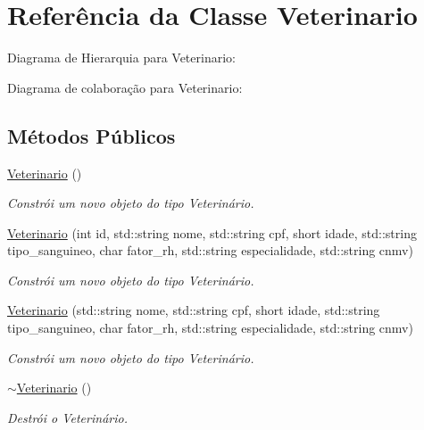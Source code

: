 \hypertarget{classVeterinario}{}\section{Referência da Classe Veterinario}
\label{classVeterinario}


Diagrama de Hierarquia para Veterinario\+:


Diagrama de colaboração para Veterinario\+:
\subsection*{Métodos Públicos}
\begin{DoxyCompactItemize}
\item 
\mbox{\label{classVeterinario_af8dc5f6f77bf8c70dd94d54766764134}} 
\hyperlink{classVeterinario_af8dc5f6f77bf8c70dd94d54766764134}{Veterinario} ()
\begin{DoxyCompactList}\small\item\em Constrói um novo objeto do tipo Veterinário. \end{DoxyCompactList}\item 
\hyperlink{classVeterinario_af54146873ef36b6ba8efb1258e153b3c}{Veterinario} (int id, std\+::string nome, std\+::string cpf, short idade, std\+::string tipo\+\_\+sanguineo, char fator\+\_\+rh, std\+::string especialidade, std\+::string cnmv)
\begin{DoxyCompactList}\small\item\em Constrói um novo objeto do tipo Veterinário. \end{DoxyCompactList}\item 
\hyperlink{classVeterinario_a78f08e93a153ac898a900c1701623903}{Veterinario} (std\+::string nome, std\+::string cpf, short idade, std\+::string tipo\+\_\+sanguineo, char fator\+\_\+rh, std\+::string especialidade, std\+::string cnmv)
\begin{DoxyCompactList}\small\item\em Constrói um novo objeto do tipo Veterinário. \end{DoxyCompactList}\item 
\mbox{\label{classVeterinario_a0de805e30bc7006d2035458f80c18671}} 
\hyperlink{classVeterinario_a0de805e30bc7006d2035458f80c18671}{$\sim$\+Veterinario} ()
\begin{DoxyCompactList}\small\item\em Destrói o Veterinário. \end{DoxyCompactList}\item 

\end{DoxyCompactItemize}
